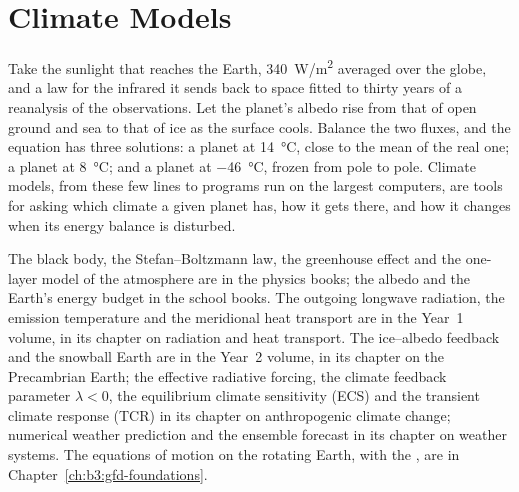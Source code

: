 \chapter{Climate Models}\label{ch:b3:climate-models}

Take the sunlight that reaches the Earth, \qty{340}{W/m^2} averaged over
the globe, and a law for the infrared it sends back to space fitted to
thirty years of a reanalysis of the observations. Let the planet's albedo rise from that
of open ground and sea to that of ice as the surface cools. Balance the two
fluxes, and the equation has three solutions: a planet at
\qty{14}{\celsius}, close to the mean of the real one; a planet at
\qty{8}{\celsius}; and a planet at \qty{-46}{\celsius}, frozen from pole to
pole. Climate models, from these few lines to programs run on the largest
computers, are tools for asking which climate a given planet has, how it
gets there, and how it changes when its energy balance is disturbed.

\begin{recall}
The black body, the Stefan--Boltzmann law, the greenhouse effect and the
one-layer model of the atmosphere are in the physics books; the albedo and
the Earth's energy budget in the school books. The outgoing longwave
radiation, the emission temperature and the meridional heat transport are
in the Year~1 volume, in its chapter on radiation and heat transport. The
ice--albedo feedback and the snowball Earth are in the Year~2 volume, in
its chapter on the Precambrian Earth; the effective radiative forcing, the
climate feedback parameter $\lambda < 0$, the equilibrium climate
sensitivity (ECS) and the transient climate response (TCR) in its chapter
on anthropogenic climate change; numerical weather prediction and the
ensemble forecast in its chapter on weather systems. The equations of
motion on the rotating Earth, with the , are in
Chapter~\ref{ch:b3:gfd-foundations}.
\end{recall}

